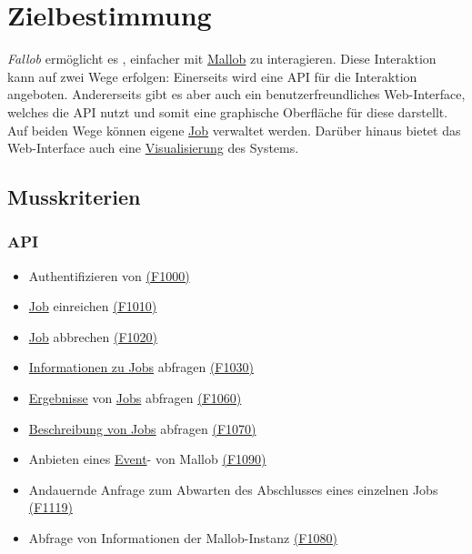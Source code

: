 \section{Zielbestimmung}
\textit{Fallob} ermöglicht es , einfacher mit \href{https://github.com/domschrei/\gls{Mallob}}{\gls{Mallob}} zu interagieren. Diese Interaktion kann auf zwei Wege erfolgen:
Einerseits wird eine \gls{API} für die Interaktion angeboten. Andererseits gibt es aber auch ein benutzerfreundliches \gls{Web-Interface}, welches die \gls{API} nutzt und somit eine graphische Oberfläche für diese darstellt. Auf beiden Wege können eigene \hyperref[B:Jobs]{Job} verwaltet werden. Darüber hinaus bietet das \gls{Web-Interface} auch eine \hyperref[pages:visualization]{Visualisierung} des Systems.


\subsection{Musskriterien}
    \subsubsection{API}
        \begin{itemize}[noitemsep]
            \item Authentifizieren von  \hyperref[FA:API:Authentifizieren von Nutzern]{(F1000)}
            \item \hyperref[B:Jobs]{Job} einreichen \hyperref[FA:API:Einreichen von Jobs]{(F1010)}
            \item \hyperref[B:Jobs]{Job} abbrechen \hyperref[FA:API:Abbrechen von eingereichten Jobs]{(F1020)}
            \item \hyperref[B:Job-Informationen]{Informationen zu Jobs} abfragen \hyperref[FA:API:Abfragen der Informationenen von Jobs]{(F1030)}
            \item \hyperref[B:Job-Ergebnis]{Ergebnisse} von \hyperref[B:Jobs]{Jobs} abfragen \hyperref[FA:API:Ausgeben des Ergebnisses für eine oder mehrere Jobs]{(F1060)}
            \item \hyperref[B:Job-Beschreibung]{Beschreibung von Jobs} abfragen \hyperref[FA:API:Ausgeben der Job-Beschreibung]{(F1070)}
            \item Anbieten eines \hyperref[B:Event]{Event}- von \gls{Mallob} \hyperref[FA:API:Ausgeben eines Event-Streams von Mallob]{(F1090)}
            \item Andauernde Anfrage zum Abwarten des Abschlusses eines einzelnen Jobs \hyperref[FA:API:Andauernde Abfrage des Ergebnisses eines Jobs]{(F1119)}
            \item Abfrage von Informationen der \gls{Mallob}-Instanz \hyperref[FA:API:Abfragen der Informationen von Mallob]{(F1080)}
        \end{itemize}
